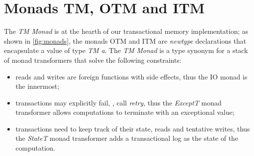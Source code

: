 \section{Monads TM, OTM and ITM}
The \emph{TM Monad} is at the hearth of our transactional memory implementation;
as shown in \cref{fig:monads}, the monads OTM and ITM are \emph{newtype} declarations that encapsulate a value of type \emph{TM a}.
The \emph{TM Monad} is a type synonym for a stack of monad transformers that solve the following constraints:
\begin{itemize}
\item reads and writes are foreign functions with side effects, thus the IO monad is the innermost;
\item transactions may explicitly fail, \ie, call \emph{retry}, thus the \emph{ExceptT} monad transformer allows computations to terminate with an exceptional value;
\item transactions need to keep track of their state, reads and tentative writes, thus the \emph{StateT} monad transformer adds a transactional log as the state of the computation.

\end{itemize}
